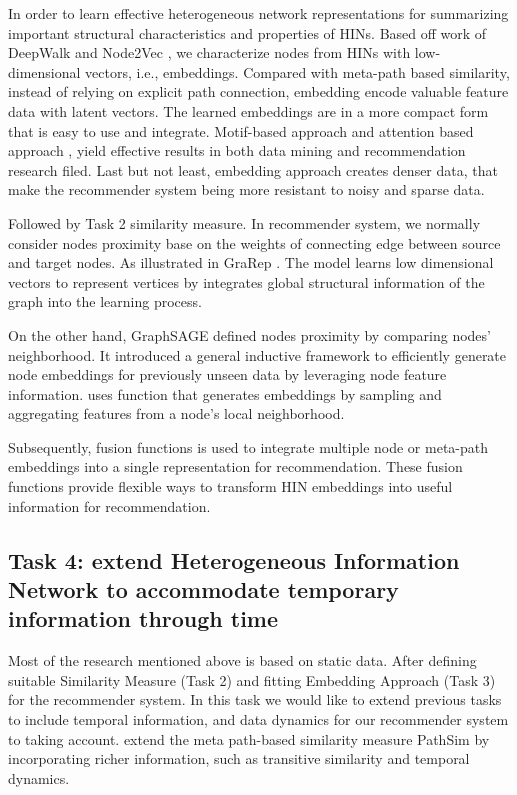 In order to learn effective heterogeneous network representations for summarizing important structural characteristics and properties of HINs. Based off work of DeepWalk \citep{perozzi2014deepwalk} and Node2Vec \citep{grover2016node2vec}, we characterize nodes from HINs with low-dimensional vectors, i.e., embeddings. 
Compared with meta-path based similarity, instead of relying on explicit path connection, embedding encode valuable feature data with latent vectors. The learned embeddings are in a more compact form that is easy to use and integrate. 
Motif-based approach \citep{tsourakakis2017scalable} and attention based approach \citep{Hu2018}, \citep{lee2018graph} yield effective results in both data mining and recommendation research filed.
Last but not least, embedding approach creates denser data, that make the recommender system being more resistant to noisy and sparse data. 

Followed by Task 2 similarity measure. In recommender system, we normally consider nodes proximity base on the weights of connecting edge between source and target nodes. As illustrated in GraRep \citep{cao2015grarep}. The model learns low dimensional vectors to represent vertices by integrates global structural information of the graph into the learning process.

On the other hand, GraphSAGE defined nodes proximity by comparing nodes' neighborhood. It introduced a general inductive framework to efficiently generate node embeddings for previously unseen data by leveraging node feature information. \citet{hamilton2017inductive} uses function that generates embeddings by sampling and aggregating features from a node’s local neighborhood.

Subsequently, fusion functions is used to integrate multiple node or meta-path embeddings into a single representation for recommendation. These fusion functions provide flexible ways to transform HIN embeddings into useful information for recommendation.


\subsection{Task 4: extend Heterogeneous Information Network to accommodate temporary information through time}

Most of the research mentioned above is based on static data. After defining suitable Similarity Measure (Task 2) and fitting Embedding Approach (Task 3) for the recommender system. In this task we would like to extend previous tasks to include temporal information, and data dynamics for our recommender system to taking account. \citet{he2014exploiting} extend the meta
path-based similarity measure PathSim by incorporating richer information, such as
transitive similarity and temporal dynamics. 

